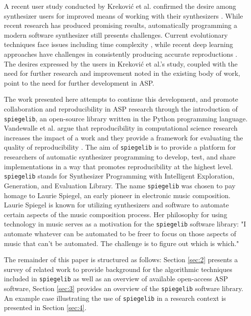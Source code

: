  A recent user study conducted by Krekovi{\'c} et al. confirmed the desire among synthesizer users for improved means of working with their synthesizers \cite{krekovic2019insights}. 
 While recent research has produced promising results, automatically programming a modern software synthesizer still presents challenges. Current evolutionary techniques face issues including time complexity \cite{tatar2016automatic}, while recent deep learning approaches have challenges in consistently producing accurate reproductions \cite{yee2018automatic}. The desires expressed by the users in Krekovi{\'c} et al.'s study, coupled with the need for further research and improvement noted in the existing body of work, point to the need for further development in ASP.
 
 The work presented here attempts to continue this development, and promote collaboration and reproducibility in ASP research through the introduction of \texttt{spiegelib}, an open-source library written in the Python programming language. Vandewalle et al. argue that reproducibility in computational science research increases the impact of a work and they provide a framework for evaluating the quality of reproducibility \cite{vandewalle2009reproducible}. The aim of \texttt{spiegelib} is to provide a platform for researchers of automatic synthesizer programming to develop, test, and share implementations in a way that promotes reproducibility at the highest level. \texttt{spiegelib} stands for Synthesizer Programming with Intelligent Exploration, Generation, and Evaluation Library. The name \texttt{spiegelib} was chosen to pay homage to Laurie Spiegel, an early pioneer in electronic music composition. Laurie Spiegel is known for utilizing synthesizers and software to automate certain aspects of the music composition process. Her philosophy for using technology in music serves as a motivation for the \texttt{spiegelib} software library: "I automate whatever can be automated to be freer to focus on those aspects of music that can't be automated. The challenge is to figure out which is which." \cite{hinkle2006women}
 
 The remainder of this paper is structured as follows: Section \ref{sec:2} presents a survey of related work to provide background for the algorithmic techniques included in \texttt{spiegelib} as well as an overview of available open-access ASP software, Section \ref{sec:3} provides an overview of the \texttt{spiegelib} software library. An example case illustrating the use of \texttt{spiegelib} in a research context is presented in Section \ref{sec:4}.


